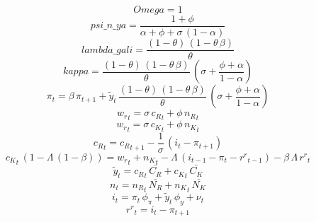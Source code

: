 \begin{dmath*}
Omega = 1
\end{dmath*}
\begin{dmath*}
psi\_n\_ya = \frac{1+{{\phi}}}{{{\alpha}}+{{\phi}}+{{\sigma}}\, \left(1-{{\alpha}}\right)}
\end{dmath*}
\begin{dmath*}
lambda\_gali = \frac{\left(1-{{\theta}}\right)\, \left(1-{{\theta}}\, {{\beta}}\right)}{{{\theta}}}
\end{dmath*}
\begin{dmath*}
kappa = \frac{\left(1-{{\theta}}\right)\, \left(1-{{\theta}}\, {{\beta}}\right)}{{{\theta}}}\, \left({{\sigma}}+\frac{{{\phi}}+{{\alpha}}}{1-{{\alpha}}}\right)
\end{dmath*}
\begin{dmath}
{{\pi}}_{t}={{\beta}}\, {{\pi}}_{t+1}+{{\tilde y}}_{t}\, \frac{\left(1-{{\theta}}\right)\, \left(1-{{\theta}}\, {{\beta}}\right)}{{{\theta}}}\, \left({{\sigma}}+\frac{{{\phi}}+{{\alpha}}}{1-{{\alpha}}}\right)
\end{dmath}
\begin{dmath}
{{w_r}}_{t}={{\sigma}}\, {{c_R}}_{t}+{{\phi}}\, {{n_R}}_{t}
\end{dmath}
\begin{dmath}
{{w_r}}_{t}={{\sigma}}\, {{c_K}}_{t}+{{\phi}}\, {{n_K}}_{t}
\end{dmath}
\begin{dmath}
{{c_R}}_{t}={{c_R}}_{t+1}-\frac{1}{{{\sigma}}}\, \left({{i}}_{t}-{{\pi}}_{t+1}\right)
\end{dmath}
\begin{dmath}
{{c_K}}_{t}\, \left(1-{{\Lambda}}\, \left(1-{{\beta}}\right)\right)={{w_r}}_{t}+{{n_K}}_{t}-{{\Lambda}}\, \left({{i}}_{t-1}-{{\pi}}_{t}-{{r^r}}_{t-1}\right)-{{\beta}}\, {{\Lambda}}\, {{r^r}}_{t}
\end{dmath}
\begin{dmath}
{{\tilde y}}_{t}={{c_R}}_{t}\, {\bar{C_R}}+{{c_K}}_{t}\, {\bar{C_K}}
\end{dmath}
\begin{dmath}
{{n}}_{t}={{n_R}}_{t}\, {\bar{N_R}}+{{n_K}}_{t}\, {\bar{N_K}}
\end{dmath}
\begin{dmath}
{{i}}_{t}={{\pi}}_{t}\, {{\phi_{\pi}}}+{{\tilde y}}_{t}\, {{\phi_{y}}}+{{\nu}}_{t}
\end{dmath}
\begin{dmath}
{{r^r}}_{t}={{i}}_{t}-{{\pi}}_{t+1}
\end{dmath}
